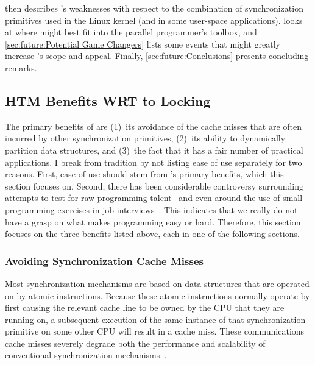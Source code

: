  then describes
's weaknesses with respect to the combination of synchronization
primitives used in the Linux kernel (and in some user-space applications).
 looks at where 
might best fit into the parallel programmer's toolbox, and
\cref{sec:future:Potential Game Changers} lists some events that might
greatly increase 's scope and appeal.
Finally, \cref{sec:future:Conclusions}
presents concluding remarks.

\subsection{HTM Benefits WRT to Locking}
\label{sec:future:HTM Benefits WRT to Locking}

The primary benefits of  are
(1)~its avoidance of the cache misses that are often incurred by
other synchronization primitives,
(2)~its ability to dynamically partition
data structures,
and (3)~the fact that it has
a fair number of practical applications.
I break from  tradition by not listing ease of use separately
for two reasons.
First, ease of use should stem from 's primary benefits,
which this section focuses on.
Second, there has been considerable controversy surrounding attempts to
test for raw programming
talent~\cite{RichardBornat2006SheepGoats,SaeedDehnadi2009SheepGoats,ElizabethPatitsas2020GradesNotBimodal}
and even around the use of small programming exercises in job
interviews~\cite{RegBraithwaite2007FizzBuzz}.
This indicates that we really do not have a grasp on what makes
programming easy or hard.
Therefore, this section focuses on the three benefits listed above,
each in one of the following sections.

\subsubsection{Avoiding Synchronization Cache Misses}
\label{sec:future:Avoiding Synchronization Cache Misses}

Most synchronization mechanisms are based on data structures that are
operated on by atomic instructions.
Because these atomic instructions normally operate by first causing
the relevant cache line to be owned by the CPU that they are running on,
a subsequent execution
of the same instance of that synchronization primitive on some other
CPU will result in a cache miss.
These communications cache misses severely degrade both the performance and
scalability of conventional synchronization
mechanisms~\cite[Section 4.2.3]{Anderson97}.

